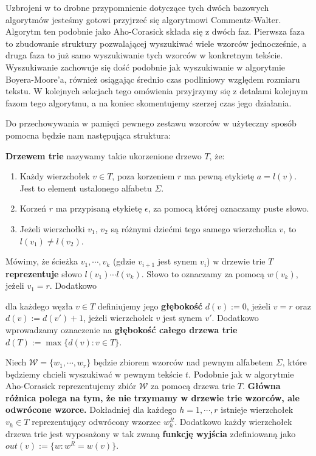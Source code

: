 Uzbrojeni w to drobne przypomnienie dotyczące tych dwóch bazowych algorytmów jesteśmy gotowi przyjrzeć się algorytmowi Commentz-Walter. Algorytm ten podobnie jako Aho-Corasick składa się z dwóch faz. Pierwsza faza to zbudowanie struktury pozwalającej wyszukiwać wiele wzorców jednocześnie, a druga faza to już samo wyszukiwanie tych wzorców w konkretnym tekście. Wyszukiwanie zachowuje się dość podobnie jak wyszukiwanie w algorytmie Boyera-Moore'a, również osiągając średnio czas podliniowy względem rozmiaru tekstu. W kolejnych sekcjach tego omówienia przyjrzymy się z detalami kolejnym fazom tego algorytmu, a na koniec skomentujemy szerzej czas jego działania.

Do przechowywania w pamięci pewnego zestawu wzorców w użyteczny sposób pomocna będzie nam następująca struktura:

\begin{definition}{}{}
\textbf{Drzewem trie} nazywamy takie ukorzenione drzewo $T$, że:
\begin{enumerate}
    \item Każdy wierzchołek $v \in T$, poza korzeniem $r$ ma pewną etykietę $a = l(v)$. Jest to element ustalonego alfabetu $\Sigma$.
    \item Korzeń $r$ ma przypisaną etykietę $\epsilon$, za pomocą której oznaczamy puste słowo.
    \item Jeżeli wierzchołki $v_1$, $v_2$ są różnymi dziećmi tego samego wierzchołka $v$, to $l(v_1) \neq l(v_2)$.
\end{enumerate}
\end{definition}

\noindent Mówimy, że ścieżka $v_1, \cdots, v_k$ (gdzie $v_{i+1}$ jest synem $v_i$) w drzewie trie $T$ \textbf{reprezentuje} słowo $l(v_1)\cdots l(v_k)$. Słowo to oznaczamy za pomocą $w(v_k)$, jeżeli $v_1 = r$. Dodatkowo 

\begin{definition}{}{}
dla każdego węzła $v\in T$ definiujemy jego \textbf{głębokość} $d(v) := 0$, jeżeli $v=r$ oraz $d(v) := d(v') + 1$, jeżeli wierzchołek $v$ jest synem $v'$.
Dodatkowo wprowadzamy oznaczenie na \textbf{głębokość całego drzewa trie} $d(T) := \max \{ d(v) : v \in T\}$.
\end{definition}

Niech $\mathcal{W} = \{ w_1, \cdots, w_r\}$ będzie zbiorem wzorców nad pewnym alfabetem $\Sigma$, które będziemy chcieli wyszukiwać w pewnym tekście $t$. Podobnie jak w algorytmie Aho-Corasick reprezentujemy zbiór $\mathcal{W}$ za pomocą drzewa trie $T$. \textbf{Główna różnica polega na tym, że nie trzymamy w drzewie trie wzorców, ale odwrócone wzorce.} Dokładniej dla każdego $h = 1,\cdots, r$ istnieje wierzchołek $v_h \in T$ reprezentujący odwrócony wzorzec $w_h^R$. Dodatkowo każdy wierzchołek drzewa trie jest wyposażony w tak zwaną \textbf{funkcję wyjścia} zdefiniowaną jako $out(v) := \{ w : w^R = w(v)\}$. 

